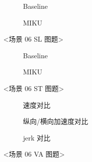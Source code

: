 \begin{figure}[H]
\centering
\begin{subfigure}[b]{\textwidth}
  \centering
  
  \caption{Baseline}
  \label{fig:exp_06_ped_plus_parked_cmp_sl:a}
\end{subfigure}

\begin{subfigure}[b]{\textwidth}
  \centering
  
  \caption{MIKU}
  \label{fig:exp_06_ped_plus_parked_cmp_sl:b}
\end{subfigure}
\caption{<场景 06 SL 图题>}
\label{fig:exp_06_ped_plus_parked_cmp_sl}
\end{figure}

\begin{figure}[H]
\centering
\begin{subfigure}[b]{0.48\textwidth}
  \centering
  
  \caption{Baseline}
  \label{fig:exp_06_ped_plus_parked_cmp_st:a}
\end{subfigure}\hfill
\begin{subfigure}[b]{0.48\textwidth}
  \centering
  
  \caption{MIKU}
  \label{fig:exp_06_ped_plus_parked_cmp_st:b}
\end{subfigure}
\caption{<场景 06 ST 图题>}
\label{fig:exp_06_ped_plus_parked_cmp_st}
\end{figure}

\begin{figure}[H]
\centering
\begin{subfigure}[b]{\textwidth}
  \centering
  
  \caption{速度对比}
  \label{fig:exp_06_ped_plus_parked_cmp_va:a}
\end{subfigure}

\begin{subfigure}[b]{\textwidth}
  \centering
  
  \caption{纵向/横向加速度对比}
  \label{fig:exp_06_ped_plus_parked_cmp_va:b}
\end{subfigure}

\begin{subfigure}[b]{\textwidth}
  \centering
  
  \caption{jerk 对比}
  \label{fig:exp_06_ped_plus_parked_cmp_va:c}
\end{subfigure}
\caption{<场景 06 VA 图题>}
\label{fig:exp_06_ped_plus_parked_cmp_va}
\end{figure}

